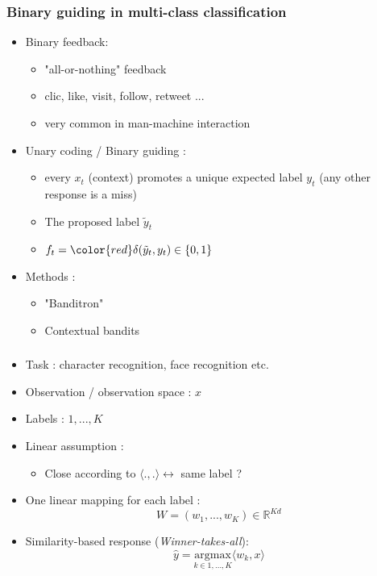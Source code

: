 \documentclass{beamer}
\begin{document}
\begin{frame}
	\frametitle{Binary guiding in multi-class classification}
	
	\begin{itemize}
		\item Binary feedback:
		\begin{itemize}
			\item "all-or-nothing" feedback
			\item clic, like, visit, follow, retweet ...
			\item very common in man-machine interaction
		\end{itemize}
		\item Unary coding / Binary guiding : 
		\begin{itemize}
			\item every $x_t$ (context) promotes a unique expected label $y_t$
			(any other response is a miss)
			\item The proposed label $\tilde{y}_t$
			\item $f_t = {\color{red}\delta(\tilde{y}_t ,y_t)} \in \{0,1\}$
		\end{itemize}
		\item Methods :
		\begin{itemize}
			\item "Banditron" \cite{kakade2008efficient}
			\item Contextual bandits
		\end{itemize}
	\end{itemize}
\end{frame}





\begin{frame}
	\frametitle{}
	\begin{itemize}
		\item Task : character recognition, face recognition etc.
		\item Observation / observation space : $x  $ 
		\item Labels : $1,...,K$
		\item Linear assumption : 
		\begin{itemize}
			
			\item Close according to $\langle .,. \rangle \leftrightarrow$ same label ?
		\end{itemize}
		\item One linear mapping for each label :
		$$ W = (w_1, ..., w_K) \in \mathbb{R}^{Kd}$$
		\item Similarity-based response (\textit{Winner-takes-all}):
		$$ \hat{y} = \underset{k \in 1,...,K}{\text{argmax}}\langle w_k,x\rangle$$
	\end{itemize}
\end{frame}
\end{document}
